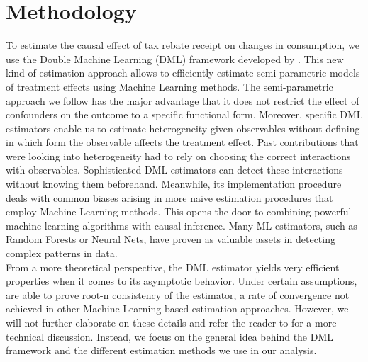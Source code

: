 \section{Methodology} \label{sec:methodology}
To estimate the causal effect of tax rebate receipt on changes in consumption, we use the Double Machine Learning (DML) framework developed by \cite{DML2017}. This new kind of estimation approach allows to efficiently estimate semi-parametric models of treatment effects using Machine Learning methods. The semi-parametric approach we follow has the major advantage that it does not restrict the effect of confounders on the outcome to a specific functional form. Moreover, specific DML estimators enable us to estimate heterogeneity given observables without defining in which form the observable affects the treatment effect. Past contributions that were looking into heterogeneity had to rely on choosing the correct interactions with observables. Sophisticated DML estimators can detect these interactions without knowing them beforehand. Meanwhile, its implementation procedure deals with common biases arising in more naive estimation procedures that employ Machine Learning methods. This opens the door to combining powerful machine learning algorithms with causal inference. Many ML estimators, such as Random Forests or Neural Nets, have proven as valuable assets in detecting complex patterns in data.\\
From a more theoretical perspective, the DML estimator yields very efficient properties when it comes to its asymptotic behavior. Under certain assumptions, \cite{DML2017} are able to prove root-n consistency of the estimator, a rate of convergence not achieved in other Machine Learning based estimation approaches. However, we will not further elaborate on these details and refer the reader to \cite{DML2017} for a more technical discussion. Instead, we focus on the general idea behind the DML framework and the different estimation methods we use in our analysis.


